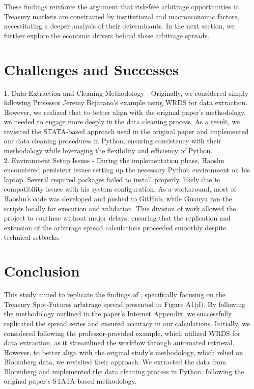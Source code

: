 \documentclass{article}
\begin{document}
These findings reinforce the argument that risk-free arbitrage opportunities in Treasury markets are constrained by institutional and macroeconomic factors, necessitating a deeper analysis of their determinants. In the next section, we further explore the economic drivers behind these arbitrage spreads.




\newpage




\section{Challenges and Successes}

1. Data Extraction and Cleaning Methodology - Originally, we considered simply following Professor Jeremy Bejarano’s example using WRDS for data extraction. However, we realized that to better align with the original paper’s methodology, we needed to engage more deeply in the data cleaning process. As a result, we revisited the STATA-based approach used in the original paper and implemented our data cleaning procedures in Python, ensuring consistency with their methodology while leveraging the flexibility and efficiency of Python. \\


2. Environment Setup Issues - During the implementation phase, Haoshu encountered persistent issues setting up the necessary Python environment on his laptop. Several required packages failed to install properly, likely due to compatibility issues with his system configuration. As a workaround, most of Haoshu’s code was developed and pushed to GitHub, while Guanyu ran the scripts locally for execution and validation. This division of work allowed the project to continue without major delays, ensuring that the replication and extension of the arbitrage spread calculations proceeded smoothly despite technical setbacks.




\section{Conclusion}
This study aimed to replicate the findings of \cite{siriwardane2023segmented}, specifically focusing on the Treasury Spot-Futures arbitrage spread presented in Figure A1(d). By following the methodology outlined in the paper’s Internet Appendix, we successfully replicated the spread series and ensured accuracy in our calculations. Initially, we considered following the professor-provided example, which utilized WRDS for data extraction, as it streamlined the workflow through automated retrieval. However, to better align with the original study’s methodology, which relied on Bloomberg data, we revisited their approach. We extracted the data from Bloomberg and implemented the data cleaning process in Python, following the original paper’s STATA-based methodology.
\end{document}
